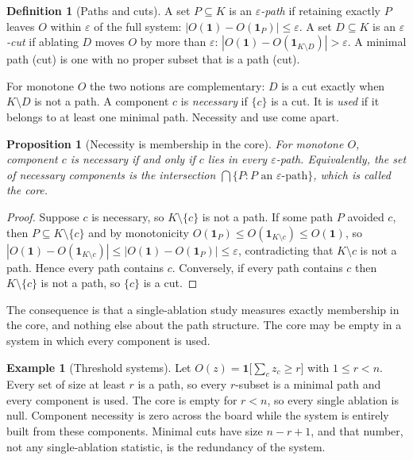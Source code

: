 \documentclass[11pt]{article}
\newtheorem{proposition}[theorem]{Proposition}
\theoremstyle{definition}
\newtheorem{definition}[theorem]{Definition}
\newtheorem{example}[theorem]{Example}
\theoremstyle{remark}
\newcommand{\ind}{\mathbf{1}}
\begin{document}
\begin{definition}[Paths and cuts]
A set $P\subseteq K$ is an \emph{$\varepsilon$-path} if retaining exactly $P$ leaves $O$ within $\varepsilon$ of the full system: $|O(\mathbf 1)-O(\mathbf 1_P)|\le\varepsilon$. A set $D\subseteq K$ is an \emph{$\varepsilon$-cut} if ablating $D$ moves $O$ by more than $\varepsilon$: $|O(\mathbf 1)-O(\mathbf 1_{K\setminus D})|>\varepsilon$. A minimal path (cut) is one with no proper subset that is a path (cut).
\end{definition}

For monotone $O$ the two notions are complementary: $D$ is a cut exactly when $K\setminus D$ is not a path. A component $c$ is \emph{necessary} if $\{c\}$ is a cut. It is \emph{used} if it belongs to at least one minimal path. Necessity and use come apart.

\begin{proposition}[Necessity is membership in the core]\label{prop:core}
For monotone $O$, component $c$ is necessary if and only if $c$ lies in every $\varepsilon$-path. Equivalently, the set of necessary components is the intersection $\bigcap\{P:P\text{ an }\varepsilon\text{-path}\}$, which is called the \emph{core}.
\end{proposition}
\begin{proof}
Suppose $c$ is necessary, so $K\setminus\{c\}$ is not a path. If some path $P$ avoided $c$, then $P\subseteq K\setminus\{c\}$ and by monotonicity $O(\mathbf 1_P)\le O(\mathbf 1_{K\setminus c})\le O(\mathbf 1)$, so $|O(\mathbf 1)-O(\mathbf 1_{K\setminus c})|\le|O(\mathbf 1)-O(\mathbf 1_P)|\le\varepsilon$, contradicting that $K\setminus c$ is not a path. Hence every path contains $c$. Conversely, if every path contains $c$ then $K\setminus\{c\}$ is not a path, so $\{c\}$ is a cut.
\end{proof}

The consequence is that a single-ablation study measures exactly membership in the core, and nothing else about the path structure. The core may be empty in a system in which every component is used.

\begin{example}[Threshold systems]
Let $O(z)=\ind\bigl[\sum_c z_c\ge r\bigr]$ with $1\le r<n$. Every set of size at least $r$ is a path, so every $r$-subset is a minimal path and every component is used. The core is empty for $r<n$, so every single ablation is null. Component necessity is zero across the board while the system is entirely built from these components. Minimal cuts have size $n-r+1$, and that number, not any single-ablation statistic, is the redundancy of the system.
\end{example}
\end{document}
